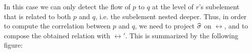 \documentclass[11pt]{article}
\begin{document}
\begin{longtable}{l@{}l@{}}
\end{longtable}

\noindent In this case we can only detect the flow of $p$ to $q$ at the level of $r$'s
subelement that is related to both $p$ and $q$, i.e. the subelement nested deeper.
Thus, in order to compute the correlation between $p$ and $q$, we need to project 
$\widehat{\sigma}$ on $\rel$, and to compose the obtained relation with $\rel'$. This is 
summarized by the following figure:  
\end{document}
